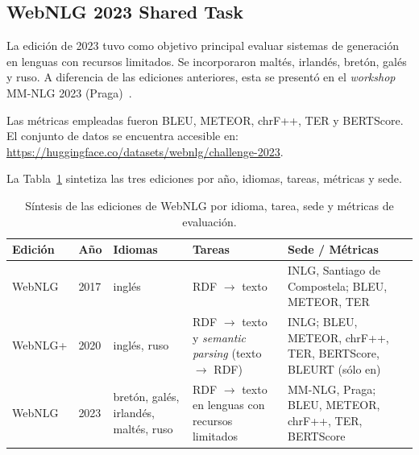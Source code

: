 \subsection{WebNLG 2023 Shared Task}

La edición de 2023 tuvo como objetivo principal evaluar sistemas de generación
en lenguas con recursos limitados. Se incorporaron maltés, irlandés, bretón,
galés y ruso. A diferencia de las ediciones anteriores, esta se presentó en el
\textit{workshop} MM-NLG 2023 (Praga)~\cite{Cripwell2023}.

Las métricas empleadas fueron BLEU, METEOR, chrF++, TER y BERTScore. El
conjunto de datos se encuentra accesible en:
\url{https://huggingface.co/datasets/webnlg/challenge-2023}.

La Tabla~\ref{tab:webnlg-ediciones} sintetiza las tres ediciones por año,
idiomas, tareas, métricas y sede.

\begin{table}[ht]
	\centering
	\footnotesize
	\begin{tabular}{lp{1.6cm}p{2.7cm}p{3.0cm}p{2.7cm}}
		\hline
		\textbf{Edición} & \textbf{Año}                                                                           & \textbf{Idiomas}                      & \textbf{Tareas}
		                 & \textbf{Sede / Métricas}                                                                                                                                 \\
		\hline
		WebNLG           & 2017                                                                                   & inglés                                & RDF $\rightarrow$ texto
		                 & INLG, Santiago de Compostela; BLEU, METEOR, TER~\cite{Gardent2017}                                                                                       \\
		WebNLG+          & 2020                                                                                   & inglés, ruso
		                 & RDF $\rightarrow$ texto y \textit{semantic parsing} (texto $\rightarrow$ RDF)
		                 & INLG; BLEU, METEOR, chrF++, TER, BERTScore, BLEURT (sólo en)~\cite{CastroFerreira2020}                                                                   \\
		WebNLG           & 2023                                                                                   & bretón, galés, irlandés, maltés, ruso
		                 & RDF $\rightarrow$ texto en lenguas con recursos limitados
		                 & MM-NLG, Praga; BLEU, METEOR, chrF++, TER, BERTScore~\cite{Cripwell2023}                                                                                  \\
		\hline
	\end{tabular}
	\caption{Síntesis de las ediciones de WebNLG por idioma, tarea, sede y
		métricas de evaluación.}
	\label{tab:webnlg-ediciones}
\end{table}

